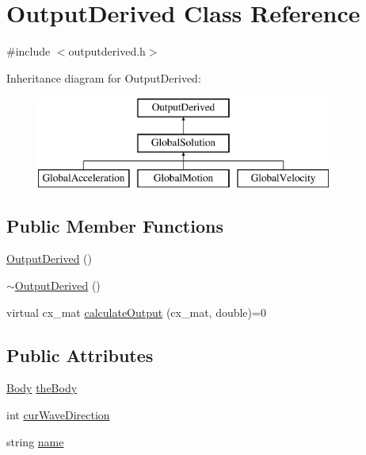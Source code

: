 \hypertarget{class_output_derived}{\section{Output\-Derived Class Reference}
\label{class_output_derived}
}


{\ttfamily \#include $<$outputderived.\-h$>$}

Inheritance diagram for Output\-Derived\-:\begin{figure}[H]
\begin{center}
\leavevmode
\includegraphics[height=3.000000cm]{class_output_derived}
\end{center}
\end{figure}
\subsection*{Public Member Functions}
\begin{DoxyCompactItemize}
\item 
\hyperlink{class_output_derived_af8b70b70b8a5089f2b673da8b59a7b6a}{Output\-Derived} ()
\item 
\hyperlink{class_output_derived_a4dde733443e52964c74d8bb6477f85f7}{$\sim$\-Output\-Derived} ()
\item 
virtual cx\-\_\-mat \hyperlink{class_output_derived_a1e0052dd24822806481976e42a2f5f30}{calculate\-Output} (cx\-\_\-mat, double)=0
\end{DoxyCompactItemize}
\subsection*{Public Attributes}
\begin{DoxyCompactItemize}
\item 
\hyperlink{class_body}{Body} \hyperlink{class_output_derived_aa326f34bcce8fa06e67016bb57069e16}{the\-Body}
\item 
int \hyperlink{class_output_derived_af0bf64d22f81f60368cd01a448596fe9}{cur\-Wave\-Direction}
\item 
string \hyperlink{class_output_derived_ae2ee713862294ab274c78a604ee962b4}{name}
\end{DoxyCompactItemize}


